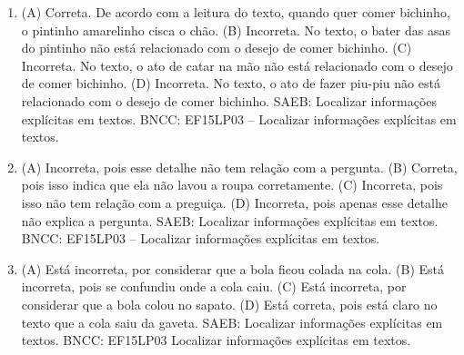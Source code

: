 
\begin{enumerate}
\item
(A) Correta. De acordo com a leitura do texto, quando quer comer
bichinho, o pintinho amarelinho cisca o chão.
(B) Incorreta. No texto, o bater das asas do pintinho não está 
relacionado com o desejo de comer bichinho.
(C) Incorreta. No texto, o ato de catar na mão não está 
relacionado com o desejo de comer bichinho.
(D) Incorreta. No texto, o ato de fazer piu-piu não está 
relacionado com o desejo de comer bichinho.
SAEB: Localizar informações explícitas em textos.
BNCC: EF15LP03 -- Localizar informações explícitas em textos.

\item
(A) Incorreta, pois esse detalhe não tem relação com  a pergunta. 
(B) Correta, pois isso indica que ela não lavou a roupa corretamente.
(C) Incorreta, pois isso não tem relação com a preguiça.
(D) Incorreta, pois apenas esse detalhe não explica a pergunta.  
SAEB: Localizar informações explícitas em textos.
BNCC: EF15LP03 -- Localizar informações explícitas em textos.

\item
(A) Está incorreta, por considerar que a bola ficou colada na cola.
(B) Está incorreta, pois se confundiu onde a cola caiu.
(C) Está incorreta, por considerar que a bola colou no sapato.
(D) Está correta, pois está claro no texto que a cola saiu da gaveta.
SAEB: Localizar informações explícitas em textos.
BNCC: EF15LP03 Localizar informações explícitas em textos.
\end{enumerate}


